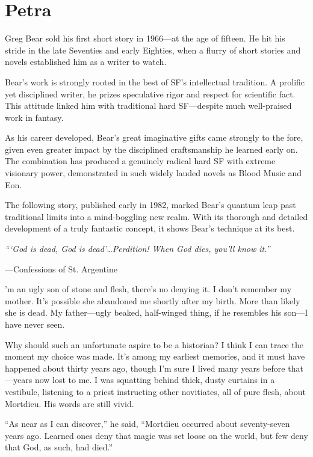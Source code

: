 \chapter{Petra}

Greg Bear sold his first short story in 1966—at the age of fifteen. He hit his stride in the late Seventies and early Eighties, when a flurry of short stories and novels established him as a writer to watch.

Bear's work is strongly rooted in the best of SF's intellectual tradition. A prolific yet disciplined writer, he prizes speculative rigor and respect for scientific fact. This attitude linked him with traditional hard SF—despite much well-praised work in fantasy.

As his career developed, Bear's great imaginative gifts came strongly to the fore, given even greater impact by the disciplined craftsmanship he learned early on. The combination has produced a genuinely radical hard SF with extreme visionary power, demonstrated in such widely lauded novels as Blood Music and Eon.

The following story, published early in 1982, marked Bear's quantum leap past traditional limits into a mind-boggling new realm. With its thorough and detailed development of a truly fantastic concept, it shows Bear's technique at its best.

\textit{```God is dead, God is dead'\ldots Perdition! When God dies, you'll know it.''}

—Confessions of St. Argentine

\hrulefill

'm an ugly son of stone and flesh, there's no denying it. I don't remember my mother. It's possible she abandoned me shortly after my birth. More than likely she is dead. My father—ugly beaked, half-winged thing, if he resembles his son—I have never seen.

Why should such an unfortunate aspire to be a historian? I think I can trace the moment my choice was made. It's among my earliest memories, and it must have happened about thirty years ago, though I'm sure I lived many years before that—years now lost to me. I was squatting behind thick, dusty curtains in a vestibule, listening to a priest instructing other novitiates, all of pure flesh, about Mortdieu. His words are still vivid.

``As near as I can discover,'' he said, ``Mortdieu occurred about seventy-seven years ago. Learned ones deny that magic was set loose on the world, but few deny that God, as such, had died.''

